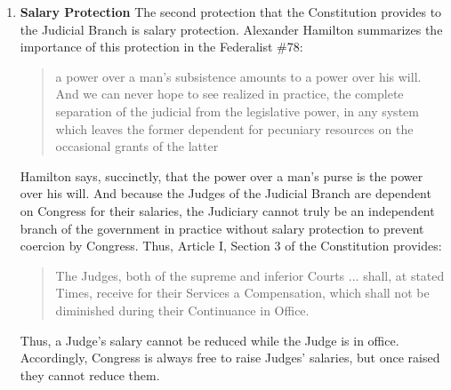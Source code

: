 \begin{enumerate}
Hamilton begins by highlighting the importance of having a separate and independent Judicial Branch -- the Judicial Branch protects the rights of the Constitution and people of the United States from encroachment by the other two branches.  Hamilton then points out that this ''inflexible and uniform adherence'' to the Constitution in defiance of attempts by the other branches to ignore or invade protected rights cannot be expected from judges that have only a temporary commission and rely on either or both of the other two branches for their continued employment.  Having to rely on another branch for continuing employment would create in judges ``an unwillingness to hazard the displeasure'' of the other branch upon which they relied for their reappointment.

Thus, according to Hamilton, life tenure gives the Judges of the United States Judicial Branch an independence that stands as an ``excellent barrier to the encroachments and oppressions'' by the other two branches and secures ``a steady, upright, and impartial administration of the laws.''\footnote{Federalist \#78.}

\item \textbf{Salary Protection}  The second protection that the Constitution provides to the Judicial Branch is salary protection.  Alexander Hamilton summarizes the importance of this protection in the Federalist \#78:
\begin{quote}
a power over a man's subsistence amounts to a power over his will. And we can never hope to see realized in practice, the complete separation of the judicial from the legislative power, in any system which leaves the former dependent for pecuniary resources on the occasional grants of the latter
\end{quote}

Hamilton says, succinctly, that the power over a man's purse is the power over his will.  And because the Judges of the Judicial Branch are dependent on Congress for their salaries, the Judiciary cannot truly be an independent branch of the government in practice without salary protection to prevent coercion by Congress.  Thus, Article I, Section 3 of the Constitution provides: 

\begin{quote}
The Judges, both of the supreme and inferior Courts ... shall, at stated Times, receive for their Services a Compensation, which shall not be diminished during their Continuance in Office.
\end{quote}

Thus, a Judge's salary cannot be reduced while the Judge is in office.  Accordingly, Congress is always free to raise Judges' salaries, but once raised they cannot reduce them.

\end{enumerate}





